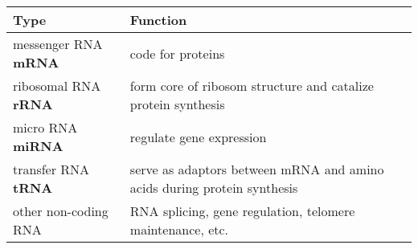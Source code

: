 \begin{tabular}{l p{38mm}}
\textbf{Type } & \textbf{Function} \\
\hline
messenger RNA \textbf{mRNA}   & code for proteins \\
ribosomal RNA \textbf{rRNA}   & form core of ribosom structure and catalize protein synthesis \\
micro RNA \textbf{miRNA} & regulate gene expression\\
transfer RNA \textbf{tRNA} & serve as adaptors between mRNA and amino acids during protein synthesis \\
other non-coding RNA & RNA splicing, gene regulation, telomere maintenance, etc. \\
\end{tabular}\\